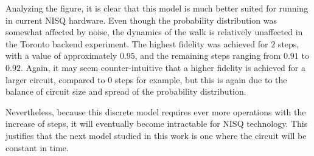 \documentclass[../../dissertation.tex]{subfiles}
\begin{document}
Analyzing the figure, it is clear that this model is much better suited for
running in current NISQ hardware. Even though the probability distribution
was somewhat affected by noise, the dynamics of the walk is relatively
unaffected in the Toronto backend experiment. The highest fidelity was
achieved for $2$ steps, with a value of approximately $0.95$, and the remaining
steps ranging from $0.91$ to $0.92$.  Again, it may seem counter-intuitive that
a higher fidelity is achieved for a larger circuit, compared to $0$ steps for
example, but this is again due to the balance of circuit size and spread of the
probability distribution.\par

Nevertheless, because this discrete model requires ever more operations with
the increase of steps, it will eventually become intractable for NISQ
technology. This justifies that the next model studied in this work is one where
the circuit will be constant in time.
\end{document}
